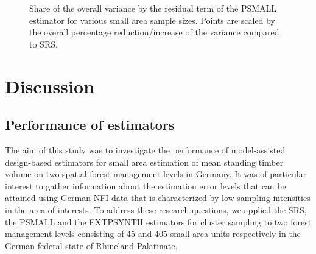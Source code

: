 \documentclass[remotesensing,article,submit,moreauthors,pdftex,10pt,a4paper]{mdpi}
\newcommand{\psmall}{PSMALL}
\newcommand{\extpsynth}{EXTPSYNTH}
\begin{document}
\begin{figure}[H]
	\centering
	\caption{Share of the overall variance by the residual term of the \psmall{} estimator for various small area sample sizes. Points are scaled by the overall percentage reduction/increase of the variance compared to SRS.}
	\label{fig:fail}
\end{figure}



\section{Discussion}
\label{sec:Dis}

\subsection{Performance of estimators}

The aim of this study was to investigate the performance of model-assisted design-based estimators for small area estimation of mean standing timber volume on two spatial forest management levels in Germany. It was of particular interest to gather information about the estimation error levels that can be attained using German NFI data that is characterized by low sampling intensities in the area of interests. To address these research questions, we applied the SRS, the \psmall{} and the \extpsynth{} estimators for cluster sampling to two forest management levels consisting of 45 and 405 small area units respectively in the German federal state of Rhineland-Palatinate.\par
\end{document}
